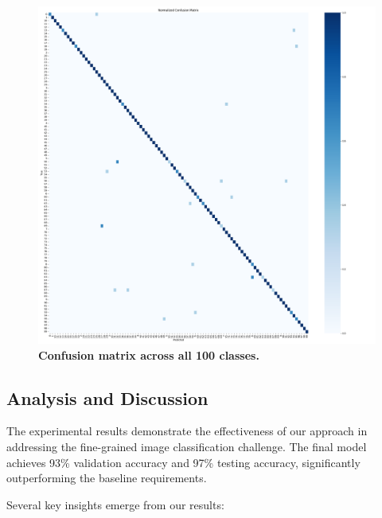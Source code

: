 \documentclass[twocolumn,a4paper]{article}
\begin{document}
\begin{figure}[H]
\centering
\includegraphics[width=0.95\linewidth]{figs/confusion_matrix}
\caption{\textbf{Confusion matrix across all 100 classes.}}
\label{fig:confusionmatrix}
\end{figure}

\subsection{Analysis and Discussion}

The experimental results demonstrate the effectiveness of our approach in addressing the fine-grained image classification challenge. The final model achieves 93\% validation accuracy and 97\% testing accuracy, significantly outperforming the baseline requirements.

Several key insights emerge from our results:
\end{document}
